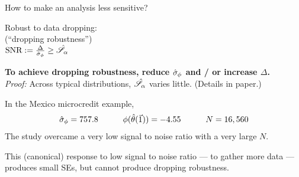 \begin{frame}[t]{How to make an analysis less sensitive?}

\begin{center}
    Robust to data dropping:\\
    (``dropping robustness'')\\
    \vspace{1em}
    $\textrm{SNR} := \frac{\Delta}{\hat\sigma_{\phi}} \ge \hat{\mathscr{S}}_\alpha$
\end{center}

\vspace{1em}
\hrulefill

\vspace{1em}
\textbf{To achieve dropping robustness,
reduce $\hat\sigma_{\phi}$ and / or increase $\Delta$.\\}
\textit{Proof: }
Across typical distributions, $\hat{\mathscr{S}}_\alpha$ varies little.
(Details in paper.)


\vspace{1em}
In the Mexico microcredit example,
%
\begin{align*}
%
\noise = \MxNoise
\quad\quad\quad
\thetafun(\thetahat(\onevec)) = \MxBetahat
\quad\quad\quad
N = \MxNobs
%
\end{align*}
%
The study overcame a very low signal to noise ratio with a very large $N$.

\vspace{1em} This (canonical) response to low signal to noise ratio --- to
gather more data --- produces small SEs, but cannot produce dropping
robustness.

\end{frame}
